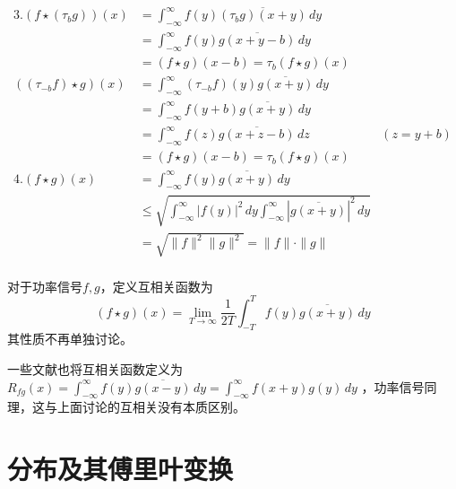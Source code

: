 \documentclass{ctexbook}
\begin{document}
\begin{align*}
    3.(f\star (\tau_b g))(x)  & =\int_{-\infty}^{\infty}f(y)\overline{(\tau_b g)(x+y)}\,dy                                                  \\
                              & =\int_{-\infty}^{\infty}f(y)\overline{g(x+y-b)}\,dy                                                         \\
                              & =(f\star g)(x-b)=\tau_{b} (f\star g)(x)                                                                     \\
    ( (\tau_{-b}f)\star g)(x) & =\int_{-\infty}^{\infty}(\tau_{-b}f)(y)\overline{g(x+y)}\,dy                                                \\
                              & =\int_{-\infty}^{\infty}f(y+b)\overline{g(x+y)}\,dy                                                         \\
                              & =\int_{-\infty}^{\infty}f(z)\overline{g(x+z-b)}\,dz                                               & (z=y+b) \\
                              & =(f\star g)(x-b)=\tau_{b} (f\star g)(x)                                                                     \\
    4. (f\star g)(x)          & =\int_{-\infty}^{\infty}f(y)\overline{g(x+y)}\,dy                                                           \\
                              & \leq \sqrt{\int_{-\infty}^{\infty}|f(y)|^2\,dy\int_{-\infty}^{\infty}|\overline{g(x+y)}|^2\,dy  }           \\
                              & =\sqrt{\|f\|^2\|g\|^2}=\|f\|\cdot\|g\|                                                                      \\
\end{align*}

对于功率信号$f,g$，定义互相关函数为
\begin{equation}
    (f\star g)(x)=\lim_{T\to\infty}\frac{1}{2T}\int_{-T}^{T}f(y)\overline{g(x+y)}\,dy
\end{equation}
其性质不再单独讨论。

一些文献也将互相关函数定义为$R_{fg}(x)=\int_{-\infty}^{\infty}f(y)\overline{g(x-y)}\,dy=\int_{-\infty}^{\infty}f(x+y)g(y)\,dy$
，功率信号同理，这与上面讨论的互相关没有本质区别。

\section{分布及其傅里叶变换}\label{sec:distributions}
\end{document}
